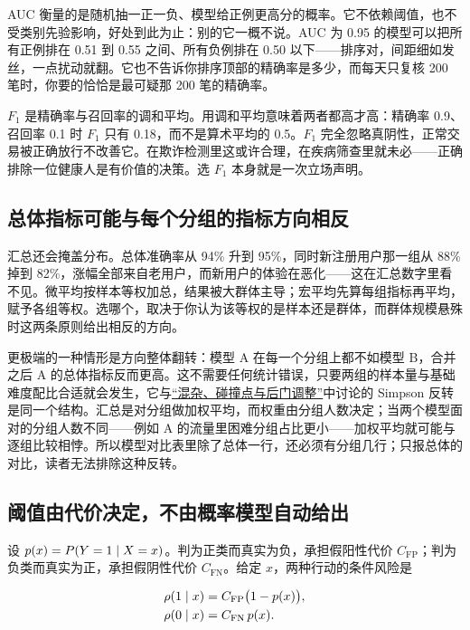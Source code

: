 AUC 衡量的是随机抽一正一负、模型给正例更高分的概率。它不依赖阈值，也不受类别先验影响，好处到此为止：别的它一概不说。AUC 为 0.95 的模型可以把所有正例排在 0.51 到 0.55 之间、所有负例排在 0.50 以下——排序对，间距细如发丝，一点扰动就翻。它也不告诉你排序顶部的精确率是多少，而每天只复核 200 笔时，你要的恰恰是最可疑那 200 笔的精确率。

\(F_1\) 是精确率与召回率的调和平均。用调和平均意味着两者都高才高：精确率 0.9、召回率 0.1 时 \(F_1\) 只有 0.18，而不是算术平均的 0.5。\(F_1\) 完全忽略真阴性，正常交易被正确放行不改善它。在欺诈检测里这或许合理，在疾病筛查里就未必——正确排除一位健康人是有价值的决策。选 \(F_1\) 本身就是一次立场声明。

\subsection{总体指标可能与每个分组的指标方向相反}

汇总还会掩盖分布。总体准确率从 94\% 升到 95\%，同时新注册用户那一组从 88\% 掉到 82\%，涨幅全部来自老用户，而新用户的体验在恶化——这在汇总数字里看不见。微平均按样本等权加总，结果被大群体主导；宏平均先算每组指标再平均，赋予各组等权。选哪个，取决于你认为该等权的是样本还是群体，而群体规模悬殊时这两条原则给出相反的方向。

更极端的一种情形是方向整体翻转：模型 A 在每一个分组上都不如模型 B，合并之后 A 的总体指标反而更高。这不需要任何统计错误，只要两组的样本量与基础难度配比合适就会发生，它与\hyperref[sec:13-Machine-Learning/12-Causal-Inference/03]{``混杂、碰撞点与后门调整''}中讨论的 Simpson 反转是同一个结构。汇总是对分组做加权平均，而权重由分组人数决定；当两个模型面对的分组人数不同——例如 A 的流量里困难分组占比更小——加权平均就可能与逐组比较相悖。所以模型对比表里除了总体一行，还必须有分组几行；只报总体的对比，读者无法排除这种反转。

\subsection{阈值由代价决定，不由概率模型自动给出}

设 \(p(x)=P(Y=1\mid X=x)\)。判为正类而真实为负，承担假阳性代价 \(C_{\mathrm{FP}}\)；判为负类而真实为正，承担假阴性代价 \(C_{\mathrm{FN}}\)。给定 \(x\)，两种行动的条件风险是

\[
\begin{aligned}
\rho(1\mid x)&=C_{\mathrm{FP}}\bigl(1-p(x)\bigr),\\
\rho(0\mid x)&=C_{\mathrm{FN}}\,p(x).
\end{aligned}
\]

